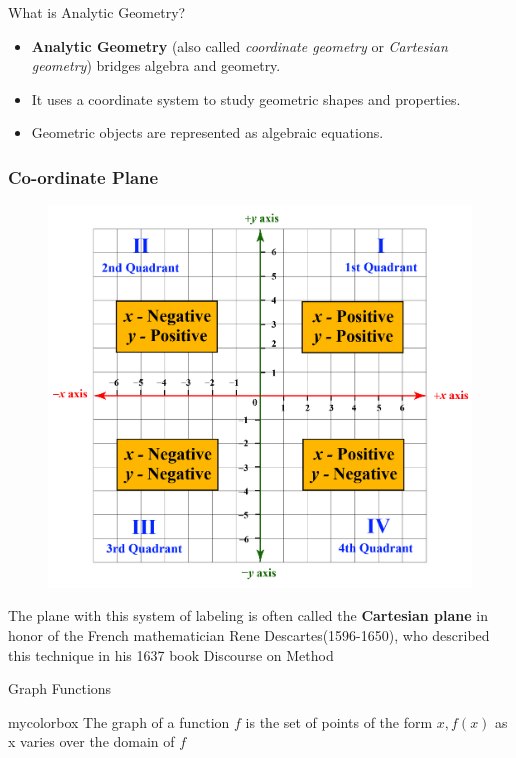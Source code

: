 \documentclass{beamer}
\begin{document}
\begin{frame}{What is Analytic Geometry?}
  \begin{itemize}
      \item \textbf{Analytic Geometry} (also called \textit{coordinate geometry} or \textit{Cartesian geometry}) bridges algebra and geometry.
      \item It uses a coordinate system to study geometric shapes and properties.
      \item Geometric objects are represented as algebraic equations.
  \end{itemize}
\end{frame}
\begin{frame}
  \frametitle{Co-ordinate Plane}
  \begin{figure}[h]    
      \centering
      \includegraphics[scale=0.23]{cartesian.png}
\end{figure}
The plane with this system of labeling is often called the \textbf{Cartesian plane} in honor of the French mathematician Rene Descartes(1596-1650), who described this technique in his 1637 book Discourse on Method
\end{frame}

\begin{frame}{Graph Functions}
  \begin{beamercolorbox}[wd=\textwidth,rounded=true,shadow=true]{mycolorbox}
The graph of a function \(f\) is the set of points of the form \(x, f (x)\) as x varies
over the domain of \(f\)
  \end{beamercolorbox}
\end{frame}
\end{document}
